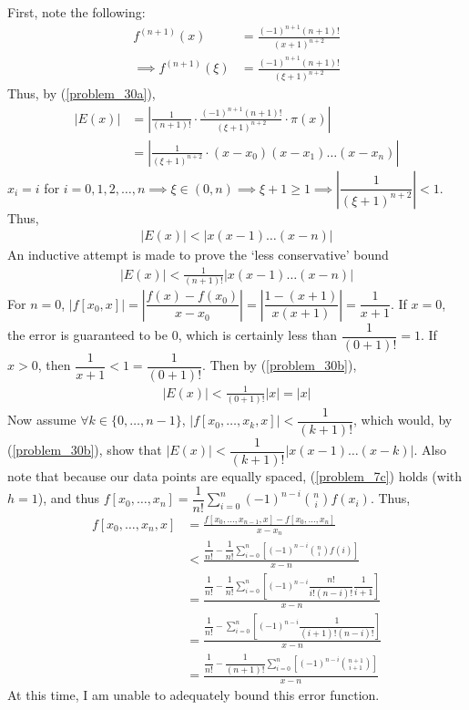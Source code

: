 \documentclass[12pt]{article}
\begin{document}
\noindent First, note the following:
\begin{align*}
f^{(n+1)}(x) &= \frac{(-1)^{n+1}(n+1)!}{(x+1)^{n+2}} \\
\implies f^{(n+1)}(\xi) &= \frac{(-1)^{n+1}(n+1)!}{(\xi+1)^{n+2}}
\end{align*}
Thus, by (\ref{problem_30a}), 
\begin{align*}
|E(x)| &= \left|\frac{1}{(n+1)!}\cdot\frac{(-1)^{n+1}(n+1)!}{(\xi+1)^{n+2}}\cdot \pi(x)\right| \\
&= \left|\frac{1}{(\xi + 1)^{n+2}}\cdot(x - x_0)(x - x_1)\dots(x - x_n)\right|
\end{align*}
$x_i = i$ for $i = 0, 1, 2, \dots, n \implies \xi \in (0, n) \implies \xi + 1 \geq 1 \implies \left|\dfrac{1}{(\xi + 1)^{n+2}}\right| < 1$.  Thus,
\begin{align*}
|E(x)| < |x(x-1)\dots(x-n)|
\end{align*}
An inductive attempt is made to prove the `less conservative' bound
\begin{align*}
|E(x)| < \frac{1}{(n+1)!}|x(x-1)\dots(x-n)|
\end{align*}
For $n = 0$, $|f[x_0, x]| = \left|\dfrac{f(x) - f(x_0)}{x - x_0}\right| = \left|\dfrac{1 - (x+1)}{x(x + 1)}\right| = \dfrac{1}{x + 1}$.  If $x = 0$, the error is guaranteed to be $0$, which is certainly less than $\dfrac{1}{(0 + 1)!} = 1$.  If $x > 0$, then $\dfrac{1}{x + 1} < 1 = \dfrac{1}{(0 + 1)!}$.  Then by (\ref{problem_30b}),
\begin{align*}
|E(x)| < \frac{1}{(0 + 1)!}|x| = |x|
\end{align*}
Now assume $\forall k \in \{0, \dots, n-1\}$, $|f[x_0, \dots, x_k, x]| < \dfrac{1}{(k + 1)!}$, which would, by (\ref{problem_30b}), show that $|E(x)| < \dfrac{1}{(k+1)!}|x(x - 1)\dots(x - k)|$.  Also note that because our data points are equally spaced, (\ref{problem_7c}) holds (with $h = 1$), and thus $f[x_0, \dots, x_n] = \dfrac{1}{n!}\displaystyle\sum\limits_{i=0}^{n}(-1)^{n-i}\binom{n}{i}f(x_i)$.  Thus,
\begin{align*}
f[x_0, \dots, x_n, x] &= \frac{f[x_0, \dots, x_{n-1}, x] - f[x_0, \dots, x_n]}{x - x_n} \\
&< \frac{\dfrac{1}{n!} - \dfrac{1}{n!}\displaystyle\sum\limits_{i = 0}^{n}\left[(-1)^{n - i}\binom{n}{i}f(i)\right]}{x - n} \\[.1cm]
&= \frac{\dfrac{1}{n!} - \dfrac{1}{n!}\displaystyle\sum\limits_{i = 0}^{n}\left[(-1)^{n - i}\dfrac{n!}{i!(n-i)!}\dfrac{1}{i + 1}\right]}{x - n} \\[.1cm]
&= \frac{\dfrac{1}{n!} - \displaystyle\sum\limits_{i = 0}^{n}\left[(-1)^{n-i}\dfrac{1}{(i + 1)!(n - i)!}\right]}{x - n} \\[.1cm]
&= \frac{\dfrac{1}{n!} - \dfrac{1}{(n+1)!}\displaystyle\sum\limits_{i = 0}^{n}\left[(-1)^{n-i}\binom{n+1}{i+1}\right]}{x - n}
\end{align*}
At this time, I am unable to adequately bound this error function.
\end{document}
